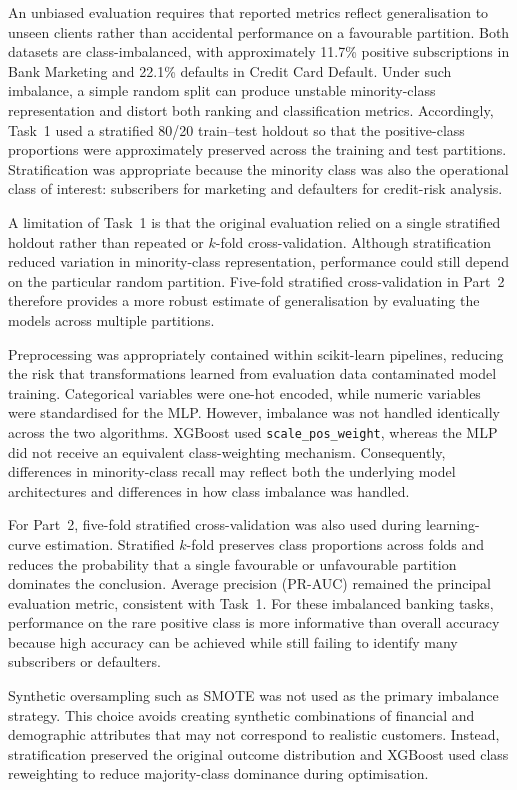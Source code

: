 \documentclass[11pt,a4paper]{article}
\begin{document}
An unbiased evaluation requires that reported metrics reflect generalisation to
unseen clients rather than accidental performance on a favourable partition. Both
datasets are class-imbalanced, with approximately 11.7\% positive subscriptions in
Bank Marketing and 22.1\% defaults in Credit Card Default. Under such imbalance, a
simple random split can produce unstable minority-class representation and distort
both ranking and classification metrics. Accordingly, Task~1 used a stratified 80/20
train--test holdout so that the positive-class proportions were approximately
preserved across the training and test partitions. Stratification was appropriate
because the minority class was also the operational class of interest: subscribers
for marketing and defaulters for credit-risk analysis.

A limitation of Task~1 is that the original evaluation relied on a single stratified
holdout rather than repeated or $k$-fold cross-validation. Although stratification
reduced variation in minority-class representation, performance could still depend on
the particular random partition. Five-fold stratified cross-validation in Part~2
therefore provides a more robust estimate of generalisation by evaluating the models
across multiple partitions.

Preprocessing was appropriately contained within scikit-learn pipelines, reducing the
risk that transformations learned from evaluation data contaminated model training.
Categorical variables were one-hot encoded, while numeric variables were standardised
for the MLP. However, imbalance was not handled identically across the two algorithms.
XGBoost used \texttt{scale\_pos\_weight}, whereas the MLP did not receive an
equivalent class-weighting mechanism. Consequently, differences in minority-class
recall may reflect both the underlying model architectures and differences in how
class imbalance was handled.

For Part~2, five-fold stratified cross-validation was also used during learning-curve
estimation. Stratified $k$-fold preserves class proportions across folds and reduces
the probability that a single favourable or unfavourable partition dominates the
conclusion. Average precision (PR-AUC) remained the principal evaluation metric,
consistent with Task~1. For these imbalanced banking tasks, performance on the rare
positive class is more informative than overall accuracy because high accuracy can be
achieved while still failing to identify many subscribers or defaulters.

Synthetic oversampling such as SMOTE was not used as the primary imbalance strategy.
This choice avoids creating synthetic combinations of financial and demographic
attributes that may not correspond to realistic customers. Instead, stratification
preserved the original outcome distribution and XGBoost used class reweighting to
reduce majority-class dominance during optimisation.
\end{document}
